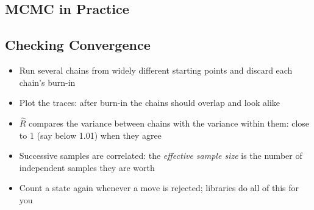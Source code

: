 
\begin{slide}
\section{MCMC in Practice}

\pause
\pb
{}
\begin{center}
  \pause
\end{center}
\end{slide}


\begin{slide}
\section[-1]{Checking Convergence}

\begin{PauseHighLight}
  \begin{itemize}
  \item Run several chains from widely different starting points and
    discard each chain's burn-in\pause
  \item Plot the traces: after burn-in the chains should overlap and
    look alike\pause
  \item $\hat{R}$ compares the variance between chains with the variance
    within them: close to 1 (say below 1.01) when they agree\pause
  \item Successive samples are correlated: the \emph{effective sample
      size} is the number of independent samples they are worth\pause
  \item Count a state again whenever a move is rejected; libraries do
    all of this for you\pause
  \end{itemize}
\end{PauseHighLight}

\end{slide}

\Outline %

